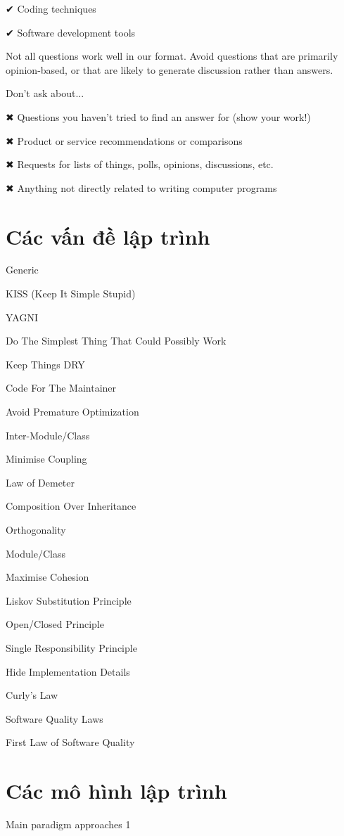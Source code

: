 ✔ Coding techniques

✔ Software development tools

Not all questions work well in our format. Avoid questions that are primarily opinion-based, or that are likely to generate discussion rather than answers.

Don't ask about...

✖ Questions you haven't tried to find an answer for (show your work!)

✖ Product or service recommendations or comparisons

✖ Requests for lists of things, polls, opinions, discussions, etc.

✖ Anything not directly related to writing computer programs

\section{Các vấn đề lập trình}

Generic

KISS (Keep It Simple Stupid)

YAGNI

Do The Simplest Thing That Could Possibly Work

Keep Things DRY

Code For The Maintainer

Avoid Premature Optimization

Inter-Module/Class

Minimise Coupling

Law of Demeter

Composition Over Inheritance

Orthogonality

Module/Class

Maximise Cohesion

Liskov Substitution Principle

Open/Closed Principle

Single Responsibility Principle

Hide Implementation Details

Curly's Law

Software Quality Laws

First Law of Software Quality


\section{Các mô hình lập trình}

Main paradigm approaches 1

